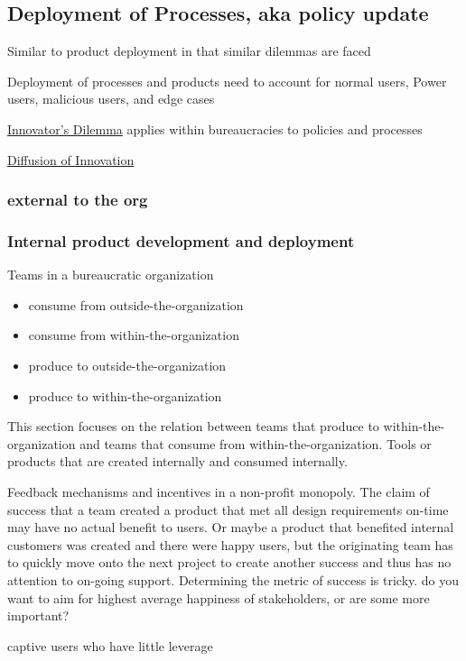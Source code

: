 \subsection{Deployment of Processes, aka policy update}


Similar to product deployment in that similar dilemmas are faced

Deployment of processes and products need to account for 
normal users, Power users, malicious users, and edge cases

\href{https://en.m.wikipedia.org/wiki/The_Innovator's_Dilemma}{Innovator's Dilemma} applies within bureaucracies to policies and processes

\href{https://en.wikipedia.org/wiki/Diffusion_of_innovations}{Diffusion of Innovation}

\subsubsection{external to the org}


\subsubsection{Internal product development and deployment\label{sec:internal_product}}

Teams in a bureaucratic organization 
\begin{itemize}
    \item consume from outside-the-organization
    \item consume from within-the-organization
    \item produce to outside-the-organization
    \item produce to within-the-organization
\end{itemize}

This section focuses on the relation between teams that produce to within-the-organization and teams that consume from within-the-organization. Tools or products that are created internally and consumed internally.

Feedback mechanisms and incentives in a non-profit monopoly. The claim of success that a team created a product that met all design requirements on-time may have no actual benefit to users. Or maybe a product that benefited internal customers was created and there were happy users, but the originating team has to quickly move onto the next project to create another success and thus has no attention to on-going support. Determining the metric of success is tricky. do you want to aim for highest average happiness of stakeholders, or are some more important?

captive users who have little leverage 



